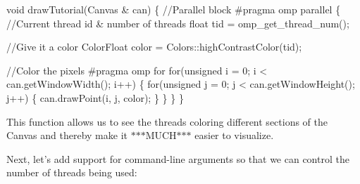 \begin{DoxyCode}
\textcolor{keywordtype}{void} drawTutorial(Canvas & can) \{
  \textcolor{comment}{//Parallel block}
\textcolor{preprocessor}{  #pragma omp parallel}
\textcolor{preprocessor}{}  \{
    \textcolor{comment}{//Current thread id & number of threads}
    \textcolor{keywordtype}{float} tid = omp\_get\_thread\_num();

    \textcolor{comment}{//Give it a color}
    ColorFloat color = Colors::highContrastColor(tid);

    \textcolor{comment}{//Color the pixels}
\textcolor{preprocessor}{    #pragma omp for}
\textcolor{preprocessor}{}    \textcolor{keywordflow}{for}(\textcolor{keywordtype}{unsigned} i = 0; i < can.getWindowWidth(); i++) \{
        \textcolor{keywordflow}{for}(\textcolor{keywordtype}{unsigned} j = 0; j < can.getWindowHeight(); j++) \{
            can.drawPoint(i, j, color);
          \}
    \}
  \}
\}
\end{DoxyCode}


This function allows us to see the threads coloring different sections of the Canvas and thereby make it $\ast$$\ast$$\ast$\-M\-U\-C\-H$\ast$$\ast$$\ast$ easier to visualize.

Next, let's add support for command-\/line arguments so that we can control the number of threads being used\-:


